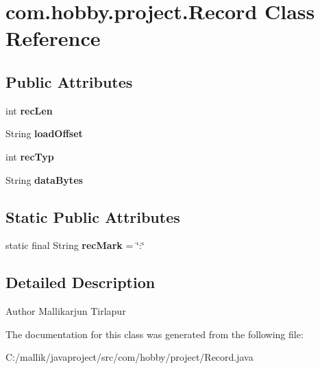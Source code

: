 \hypertarget{classcom_1_1hobby_1_1project_1_1_record}{}\section{com.\+hobby.\+project.\+Record Class Reference}
\label{classcom_1_1hobby_1_1project_1_1_record}
\subsection*{Public Attributes}
\begin{DoxyCompactItemize}
\item 
\mbox{\label{classcom_1_1hobby_1_1project_1_1_record_addb0d0dba541731a24271f92a2d59ee4}} 
int {\bfseries rec\+Len}
\item 
\mbox{\label{classcom_1_1hobby_1_1project_1_1_record_af9dfbe833f4b9ee6864c509e985ca386}} 
String {\bfseries load\+Offset}
\item 
\mbox{\label{classcom_1_1hobby_1_1project_1_1_record_a4a2b733db875d2106ca5bd07a6364333}} 
int {\bfseries rec\+Typ}
\item 
\mbox{\label{classcom_1_1hobby_1_1project_1_1_record_a51859e076f3924144e00a1eff523ba46}} 
String {\bfseries data\+Bytes}
\end{DoxyCompactItemize}
\subsection*{Static Public Attributes}
\begin{DoxyCompactItemize}
\item 
\mbox{\label{classcom_1_1hobby_1_1project_1_1_record_a0c0ea01eacfe990cae84167a2be703c1}} 
static final String {\bfseries rec\+Mark} = \char`\"{}\+:\char`\"{}
\end{DoxyCompactItemize}


\subsection{Detailed Description}
\begin{DoxyAuthor}{Author}
Mallikarjun Tirlapur 
\end{DoxyAuthor}


The documentation for this class was generated from the following file\+:\begin{DoxyCompactItemize}
\item 
C\+:/mallik/javaproject/src/com/hobby/project/Record.\+java\end{DoxyCompactItemize}
